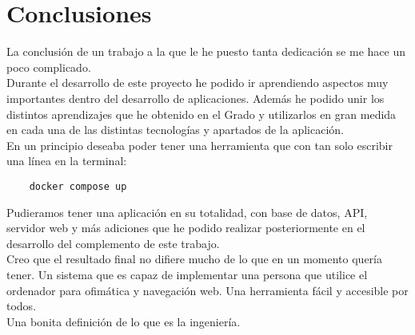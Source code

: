 \section{Conclusiones}
La conclusión de un trabajo a la que le he puesto tanta dedicación se me hace un poco complicado.
\\Durante el desarrollo de este proyecto he podido ir aprendiendo aspectos muy importantes dentro del desarrollo de aplicaciones. Además he podido unir los distintos aprendizajes que he obtenido en el Grado y utilizarlos en gran medida en cada una de las distintas tecnologías y apartados de la aplicación.
\\En un principio deseaba poder tener una herramienta que con tan solo escribir una línea en la terminal:
\begin{verbatim}
    docker compose up
\end{verbatim}
Pudieramos tener una aplicación en su totalidad, con base de datos, API, servidor web y más adiciones que he podido realizar posteriormente en el desarrollo del complemento de este trabajo.
\\Creo que el resultado final no difiere mucho de lo que en un momento quería tener. Un sistema que es capaz de implementar una persona que utilice el ordenador para ofimática y navegación web. Una herramienta fácil y accesible por todos.
\\Una bonita definición de lo que es la ingeniería.